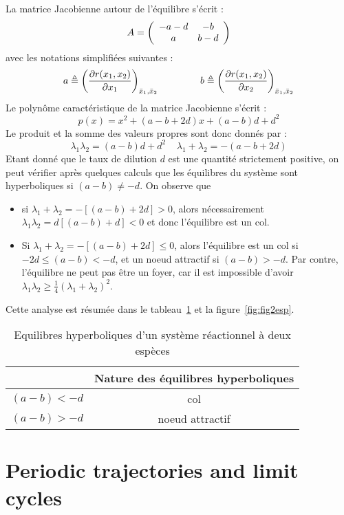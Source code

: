 La matrice Jacobienne autour de l'{é}quilibre s'{é}crit :
$$
A = \bma{cc}
-a-d & -b \\a & b-d
\ema
$$
avec les notations simplifi{é}es suivantes :
$$
a  \triangleq \left( \frac{\partial r(x_1,x_2)}{\partial x_1} \right )_{\bar
x_1, \bar x_2} \hspace*{15mm} b \triangleq \left( \frac{\partial r(x_1,x_2)}{\partial x_2} \right )_{\bar
x_1, \bar x_2} 
$$
Le polyn{\^o}me caract{é}ristique de la matrice Jacobienne s'{é}crit :
$$
p(x) = x^2 + (a-b +2d) x + (a-b) d +d^2
$$
Le produit et la somme des valeurs propres sont donc donn{é}s par :
$$
\lambda_1 \lambda_2 = (a-b)d+d^2 \;\;\;\; \lambda_1 + \lambda_2 = -(a-b+2d)
$$
Etant donn{é} que le taux de dilution $d$ est une quantit{é} strictement positive,
on peut v{é}rifier apr{è}s quelques calculs que les {é}quilibres du syst{è}me sont
hyperboliques si $(a-b) \neq -d$. On observe que 
\begin{itemize}
\item si $\lambda_1 + \lambda_2 = -[(a-b)+2d]>0$, alors n{é}cessairement
$\lambda_1 \lambda_2 = d[(a-b)+d]<0$ et donc l'{é}quilibre est un col.
\item Si $\lambda_1 + \lambda_2 = -[(a-b)+2d]\leq 0$, alors l'{é}quilibre est un col
si $-2d\leq(a-b)<-d$, et un noeud attractif si $(a-b)>-d$.  Par contre,
l'{é}quilibre ne peut pas {ê}tre un foyer, car il est impossible d'avoir
$\lambda_1 \lambda_2 \geq \frac{1}{4} (\lambda_1 + \lambda_2)^2$.
\end{itemize}
Cette analyse est r{é}sum{é}e dans 
le tableau~\ref{tab2esp} et la figure~\ref{fig:fig2esp}.

\begin{table}
\hspace*{10mm}
\renewcommand{\arraystretch}{3.0}
\begin{tabular}{|c|c|}
\hline
&Nature des {é}quilibres hyperboliques\\ \hline
$(a-b)<-d$&col \\ \hline
$(a-b)>-d$&noeud attractif \\ \hline
\end{tabular}
\caption{Equilibres hyperboliques d'un syst{è}me r{é}actionnel {à} deux esp{è}ces}
\label{tab2esp}
\end{table}

\section{Periodic trajectories and limit cycles}

